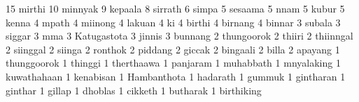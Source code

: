      15 mirthi
     10 minnyak 
      9 kepaala
      8 sirrath 
      6 simpa   
      5 sesaama 
      5 nnam
      5 kubur
      5 kenna    
      4 mpath 
      4 miinong
      4 lakuan
      4 ki
      4 birthi
      4 birnang
      4 binnar
      3 subala
      3 siggar   
      3 mma
      3 Katugastota
      3 jinnis  
      3 bunnang
      2 thungoorok
      2 thiiri
      2 thiinngal   
      2 siinggal
      2 siinga
      2 ronthok
      2 piddang
      2 giccak
      2 bingaali
      2 billa 
      2 apayang 
      1 thunggoorok
      1 thinggi
      1 therthaawa 
      1 panjaram   
      1 muhabbath
      1 mnyalaking
      1 kuwathahaan 
      1 kenabisan 
      1 Hambanthota
      1 hadarath
      1 gummuk 
      1 gintharan
      1 ginthar
      1 gillap
      1 dhoblas 
      1 cikketh
      1 butharak
      1 birthiking  
